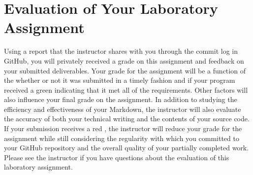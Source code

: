 \documentclass[11pt]{article}
\newcommand{\checkmark}{\ding{51}}
\newcommand{\naughtmark}{\ding{55}}
\begin{document}
\vspace*{-.15in}

\section*{Evaluation of Your Laboratory Assignment}

Using a report that the instructor shares with you through the commit log in
GitHub, you will privately received a grade on this assignment and feedback on
your submitted deliverables. Your grade for the assignment will be a function of
the whether or not it was submitted in a timely fashion and if your program
received a green \checkmark{} indicating that it met all of the requirements.
Other factors will also influence your final grade on the assignment. In
addition to studying the efficiency and effectiveness of your Markdown, the
instructor will also evaluate the accuracy of both your technical writing and
the contents of your source code. If your submission receives a red
\naughtmark{}, the instructor will reduce your grade for the assignment while
still considering the regularity with which you committed to your GitHub
repository and the overall quality of your partially completed work. Please see
the instructor if you have questions about the evaluation of this laboratory
assignment.


\end{document}
